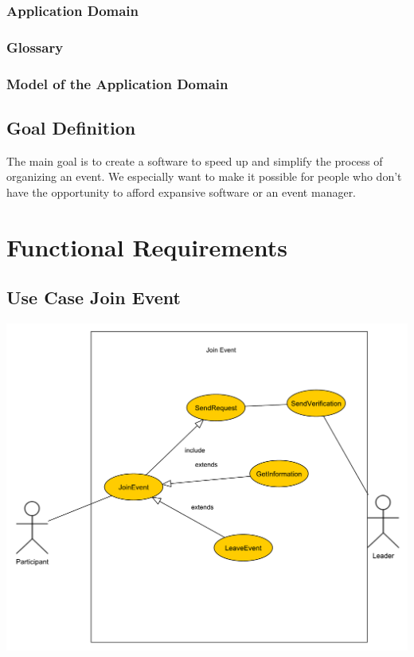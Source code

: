 \documentclass[12pt]{article}
\theoremstyle{definition}
\begin{document}
\subsubsection{Application Domain}



\subsubsection{Glossary}

\subsubsection{Model of the Application Domain}

\subsection{Goal Definition}
The main goal is to create a software to speed up and simplify the process of organizing an event. We especially want to make it possible for people who don't have the opportunity to afford expansive software or an event manager.
\pagebreak

\section{Functional Requirements}

\subsection{Use Case Join Event}

\includegraphics[scale=.5]{JoinEvent.pdf}
\end{document}
